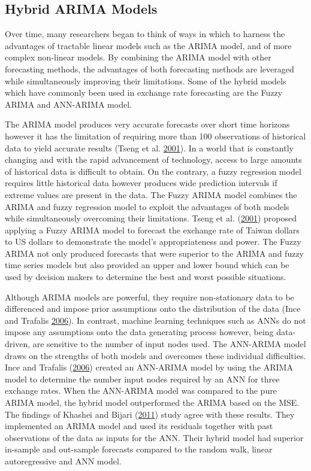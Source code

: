 \documentclass[12pt,preprint, authoryear]{elsarticle}
\numberwithin{equation}{section}
\numberwithin{figure}{section}
\numberwithin{table}{section}
\begin{document}
\subsection{Hybrid ARIMA Models}\label{hybrid-arima-models}

Over time, many researchers began to think of ways in which to harness
the advantages of tractable linear models such as the ARIMA model, and
of more complex non-linear models. By combining the ARIMA model with
other forecasting methods, the advantages of both forecasting methods
are leveraged while simultaneously improving their limitations. Some of
the hybrid models which have commonly been used in exchange rate
forecasting are the Fuzzy ARIMA and ANN-ARIMA model.

The ARIMA model produces very accurate forecasts over short time
horizons however it has the limitation of requiring more than 100
observations of historical data to yield accurate results (Tseng et al.
\protect\hyperlink{ref-tseng2001}{2001}). In a world that is constantly
changing and with the rapid advancement of technology, access to large
amounts of historical data is difficult to obtain. On the contrary, a
fuzzy regression model requires little historical data however produces
wide prediction intervals if extreme values are present in the data. The
Fuzzy ARIMA model combines the ARIMA and fuzzy regression model to
exploit the advantages of both models while simultaneously overcoming
their limitations. Tseng et al.
(\protect\hyperlink{ref-tseng2001}{2001}) proposed applying a Fuzzy
ARIMA model to forecast the exchange rate of Taiwan dollars to US
dollars to demonstrate the model's appropriateness and power. The Fuzzy
ARIMA not only produced forecasts that were superior to the ARIMA and
fuzzy time series models but also provided an upper and lower bound
which can be used by decision makers to determine the best and worst
possible situations.

Although ARIMA models are powerful, they require non-stationary data to
be differenced and impose prior assumptions onto the distribution of the
data (Ince and Trafalis \protect\hyperlink{ref-ince2006}{2006}). In
contrast, machine learning techniques such as ANNs do not impose any
assumptions onto the data generating process however, being data-driven,
are sensitive to the number of input nodes used. The ANN-ARIMA model
draws on the strengths of both models and overcomes these individual
difficulties. Ince and Trafalis (\protect\hyperlink{ref-ince2006}{2006})
created an ANN-ARIMA model by using the ARIMA model to determine the
number input nodes required by an ANN for three exchange rates. When the
ANN-ARIMA model was compared to the pure ARIMA model, the hybrid model
outperformed the ARIMA based on the MSE. The findings of Khashei and
Bijari (\protect\hyperlink{ref-khashei2011}{2011}) study agree with
these results. They implemented an ARIMA model and used its residuals
together with past observations of the data as inputs for the ANN. Their
hybrid model had superior in-sample and out-sample forecasts compared to
the random walk, linear autoregressive and ANN model.
\end{document}
